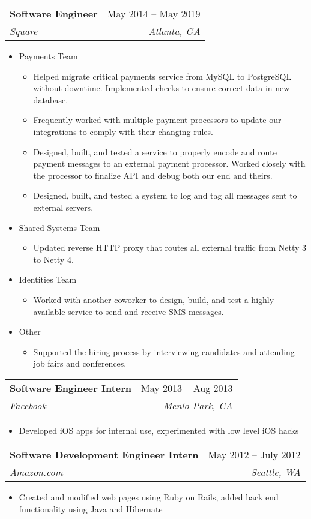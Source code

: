 \documentclass[letterpaper,12pt]{article}
\makeatletter
\newcommand{\resumeItem}[1]{
  \item\small{
    {#1 \vspace{-2pt}}
  }
}
\newcommand{\resumeSubheading}[4]{
  \vspace{-2pt}\item
    \begin{tabular*}{0.97\textwidth}[t]{l@{\extracolsep{\fill}}r}
      \textbf{#1} & #2 \\
      \textit{\small#3} & \textit{\small #4} \\
    \end{tabular*}\vspace{-7pt}
}
\newcommand{\resumeSubSubheading}[2]{
    \item
    \begin{tabular*}{0.97\textwidth}{l@{\extracolsep{\fill}}r}
      \textit{\small#1} & \textit{\small #2} \\
    \end{tabular*}\vspace{-7pt}
}
\newcommand{\resumeSubHeadingListEnd}{\end{itemize}}
\newcommand{\resumeItemListStart}{\begin{itemize}}
\newcommand{\resumeItemListEnd}{\end{itemize}\vspace{-5pt}}
\makeatother
\begin{document}
    \resumeSubheading
      {Software Engineer}{May 2014 -- May 2019}
      {Square}{Atlanta, GA}
      \resumeItemListStart
        \resumeItem{Payments Team}
            \resumeItemListStart
            \resumeItem{Helped migrate critical payments service from MySQL to PostgreSQL without downtime. Implemented checks to ensure correct data in new database.}
            \resumeItem{Frequently worked with multiple payment processors to update our integrations to comply with their changing rules.}
            \resumeItem{Designed, built, and tested a service to properly encode and route payment messages to an external payment processor. Worked closely with the processor to finalize API and debug both our end and theirs.}
            \resumeItem{Designed, built, and tested a system to log and tag all messages sent to external servers.}
            \resumeItemListEnd
        \resumeItem{Shared Systems Team}
            \resumeItemListStart
            \resumeItem{Updated reverse HTTP proxy that routes all external traffic from Netty 3 to Netty 4.}
            \resumeItemListEnd
        \resumeItem{Identities Team}
            \resumeItemListStart
            \resumeItem{Worked with another coworker to design, build, and test a highly available service to send and receive SMS messages.}
            \resumeItemListEnd
        \resumeItem{Other}
            \resumeItemListStart
            \resumeItem{Supported the hiring process by interviewing candidates and attending job fairs and conferences.}
            \resumeItemListEnd
      \resumeItemListEnd
      

    \resumeSubheading
      {Software Engineer Intern}{May 2013 -- Aug 2013}
      {Facebook}{Menlo Park, CA}
      \resumeItemListStart
        \resumeItem{Developed iOS apps for internal use, experimented with low level iOS hacks}
    \resumeItemListEnd

    \resumeSubheading
      {Software Development Engineer Intern}{May 2012 -- July 2012}
      {Amazon.com}{Seattle, WA}
      \resumeItemListStart
        \resumeItem{Created and modified web pages using Ruby on Rails, added back end functionality using Java and Hibernate}
      \resumeItemListEnd
\end{document}
